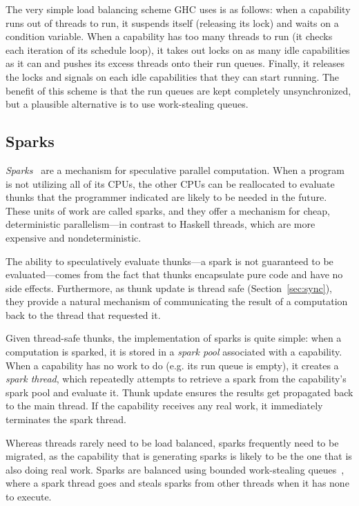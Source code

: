 The very simple load balancing scheme GHC uses is as follows: when a
capability runs out of threads to run, it suspends itself (releasing its
lock) and waits on a condition variable.  When a capability has too many
threads to run (it checks each iteration of its schedule loop), it takes
out locks on as many idle capabilities as it can and pushes its excess
threads onto their run queues.  Finally, it releases the locks and
signals on each idle capabilities that they can start running.  The
benefit of this scheme is that the run queues are kept completely
unsynchronized, but a plausible alternative is to use work-stealing
queues.

\subsection{Sparks}

\emph{Sparks}~\cite{Marlow2009} are a mechanism for speculative parallel computation.
When a program is not utilizing all of its CPUs, the other CPUs can be
reallocated to evaluate thunks that the programmer indicated are likely
to be needed in the future.  These units of work are called sparks, and
they offer a mechanism for cheap, deterministic parallelism---in contrast to
Haskell threads, which are more expensive and nondeterministic.

The ability to speculatively evaluate thunks---a spark is not guaranteed
to be evaluated---comes from the fact that thunks encapsulate pure code
and have no side effects.  Furthermore, as thunk update is thread safe
(Section~\ref{sec:sync}), they provide a natural mechanism of communicating
the result of a computation back to the thread that requested it.

Given thread-safe thunks, the implementation of sparks is quite simple:
when a computation is sparked, it is stored in a \emph{spark pool}
associated with a capability.  When a capability has no work to do (e.g.
its run queue is empty), it creates a \emph{spark thread}, which
repeatedly attempts to retrieve a spark from the capability's spark pool
and evaluate it.  Thunk update ensures the results get propagated back
to the main thread. If the capability receives any real work, it
immediately terminates the spark thread.

Whereas threads rarely need to be load balanced, sparks frequently need
to be migrated, as the capability that is generating sparks is likely to
be the one that is also doing real work.  Sparks are balanced using
bounded work-stealing queues~\cite{Arora:1998:TSM:277651.277678,Hendler2005}, where a spark thread goes and steals
sparks from other threads when it has none to execute.


